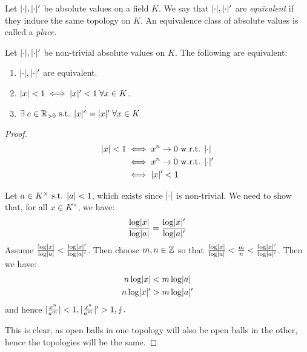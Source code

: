 \documentclass[10pt,a4paper]{article}
\begin{document}
\begin{definition}
  Let $\lvert\cdot\rvert, \lvert\cdot\rvert'$ be absolute values on a field $K$. We say that $\lvert\cdot\rvert, \lvert\cdot\rvert'$ are \emph{equivalent} if they induce the same topology on $K$. An equivalence class of absolute values is called a \emph{place}.
\end{definition}

\begin{proposition}
  Let $\lvert\cdot\rvert, \lvert\cdot\rvert'$ be non-trivial absolute values on $K$. The following are equivalent:
  \begin{enumerate}
    \item $\lvert\cdot\rvert, \lvert\cdot\rvert'$ are equivalent.
    \item $\abs{x} < 1 \iff \abs{x}' < 1 \forall x\in K$.
    \item $\exists c \in \R_{>0} \st \abs{x}^c = \abs{x}' \forall x \in K$
  \end{enumerate}
\end{proposition}
\begin{proof}\hspace*{0cm}\\
  \begin{align}
    \lvert x\rvert<1 &\iff x^n \to 0 \text{ w.r.t. } \lvert\cdot\rvert\\
    &\iff x^n \to 0 \text{ w.r.t. } \lvert\cdot\rvert'\\
    &\iff \lvert x\rvert' < 1
  \end{align}

   Let $a \in K^{\times} \text{ s.t. } \lvert a\rvert < 1$, which exists since $\lvert\cdot\rvert$ is non-trivial. We need to show that, for all $x \in K^\times$, we have:
  \begin{align*}
    \frac{\log\lvert x\rvert}{\log\lvert a\rvert} = \frac{\log\lvert x\rvert'}{\log\lvert a\rvert'}
  \end{align*}
  Assume $\frac{\log\lvert x\rvert}{\log\lvert a\rvert} < \frac{\log\lvert x\rvert'}{\log\lvert a\rvert'}$. Then choose $m,n \in \mathbb{Z}$ so that $\frac{\log\lvert x\rvert}{\log\lvert a\rvert} < \frac{m}{n} < \frac{\log\lvert x\rvert'}{\log\lvert a\rvert'}$. Then we have:
  \begin{align*}
    n \log \lvert x\rvert &< m \log \lvert a\rvert\\
    n \log \lvert x\rvert' &> m \log \lvert a\rvert'
  \end{align*}
  and hence $\lvert\frac{x^n}{a^m}\rvert < 1, \lvert\frac{x^n}{a^m}\rvert' > 1, \lightning.$

   This is clear, as open balls in one topology will also be open balls in the other, hence the topologies will be the same.
\end{proof}
\end{document}
